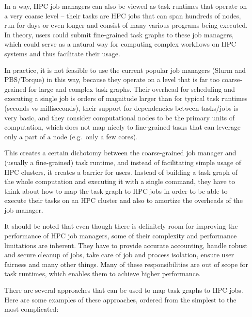 In a way, HPC job managers can also be viewed as task runtimes that operate on a very coarse
level -- their tasks are HPC jobs that can span hundreds of nodes, run for days or even longer and
consist of many various programs being executed. In theory, users could submit fine-grained task
graphs to these job managers, which could serve as a natural way for computing complex workflows on
HPC systems and thus facilitate their usage.

In practice, it is not feasible to use the current popular job managers (Slurm and PBS/Torque) in
this way, because they operate on a level that is far too coarse-grained for large and complex task
graphs. Their overhead for scheduling and executing a single job is orders of magnitude larger
than for typical task runtimes (seconds vs milliseconds), their support for dependencies between
tasks/jobs is very basic, and they consider computational nodes to be the primary units of
computation, which does not map nicely to fine-grained tasks that can leverage only a part of a
node (e.g.\ only a few cores).

This creates a certain dichotomy between the coarse-grained job manager and (usually a
fine-grained) task runtime, and instead of facilitating simple usage of HPC clusters, it creates a
barrier for users. Instead of building a task graph of the whole computation and executing it with
a single command, they have to think about how to map the task graph to HPC jobs in order to be
able to execute their tasks on an HPC cluster and also to amortize the overheads of the job
manager.

It should be noted that even though there is definitely room for improving the performance of
HPC job managers, some of their complexity and performance limitations are inherent. They have
to provide accurate accounting, handle robust and secure cleanup of jobs, take care of job and
process isolation, ensure user fairness and many other things. Many of these responsibilities are
out of scope for task runtimes, which enables them to achieve higher performance.

There are several approaches that can be used to map task graphs to HPC jobs.
Here are some examples of these approaches, ordered from the simplest to the most complicated:

